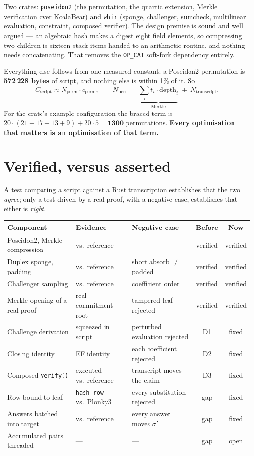 \documentclass[11pt,a4paper]{article}
\newcommand{\ok}{{\color{good}\textsf{\footnotesize verified}}}
\newcommand{\fixed}{{\color{good}\textsf{\footnotesize fixed}}}
\newcommand{\bad}[1]{{\color{signal}\textsf{\footnotesize #1}}}
\begin{document}
Two crates: \texttt{poseidon2} (the permutation, the quartic extension, Merkle verification over
KoalaBear) and \texttt{whir} (sponge, challenger, sumcheck, multilinear evaluation, constraint,
composed verifier). The design premise is sound and well argued --- an algebraic hash makes a digest
eight field elements, so compressing two children is sixteen stack items handed to an arithmetic
routine, and nothing needs concatenating. That removes the \texttt{OP\_CAT} soft-fork dependency
entirely.

Everything else follows from one measured constant: a Poseidon2 permutation is
\textbf{572\,228 bytes} of script, and nothing else is within 1\% of it. So
\[
  C_{\mathrm{script}}\approx N_{\mathrm{perm}}\cdot c_{\mathrm{perm}},
  \qquad
  N_{\mathrm{perm}}=\underbrace{\sum_{i}t_{i}\cdot\mathrm{depth}_{i}}_{\text{Merkle}}
  \;+\; N_{\mathrm{transcript}} .
\]
For the crate's example configuration the braced term is
$20\cdot(21{+}17{+}13{+}9)+20\cdot5=\mathbf{1300}$ permutations. \textbf{Every optimisation that
matters is an optimisation of that term.}

\section{Verified, versus asserted}

A test comparing a script against a Rust transcription establishes that the two \emph{agree}; only a
test driven by a real proof, with a negative case, establishes that either is \emph{right}.

\begin{center}\small
\begin{tabular}{@{}p{4.4cm}p{3.6cm}p{3.2cm}cc@{}}
\toprule
\textbf{Component} & \textbf{Evidence} & \textbf{Negative case} & \textbf{Before} & \textbf{Now}\\
\midrule
Poseidon2, Merkle compression & vs.\ reference & --- & \ok & \ok\\
Duplex sponge, padding & vs.\ reference & short absorb $\neq$ padded & \ok & \ok\\
Challenger sampling & vs.\ reference & coefficient order & \ok & \ok\\
Merkle opening of a real proof & real commitment root & tampered leaf rejected & \ok & \ok\\
Challenge derivation & squeezed in script & perturbed evaluation rejected & \bad{D1} & \fixed\\
Closing identity & EF identity & each coefficient rejected & \bad{D2} & \fixed\\
Composed \texttt{verify()} & executed vs.\ reference & transcript moves the claim & \bad{D3} & \fixed\\
Row bound to leaf & \texttt{hash\_row} vs.\ Plonky3 & every substitution rejected & \bad{gap} & \fixed\\
Answers batched into target & vs.\ reference & every answer moves $\sigma'$ & \bad{gap} & \fixed\\
Accumulated pairs threaded & --- & --- & \bad{gap} & \bad{open}\\
\bottomrule
\end{tabular}
\end{center}
\end{document}
